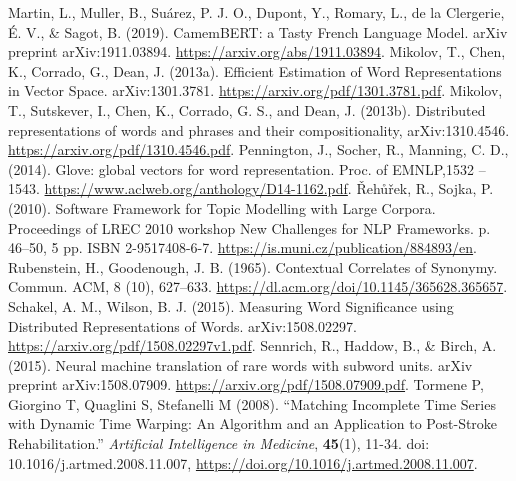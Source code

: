 \documentclass[11pt,french,french]{article}
\begin{document}
\begin{thebibliography}{999}
 Martin, L., Muller, B., Suárez, P. J. O., Dupont, Y., Romary, L., de la Clergerie, É. V., \& Sagot, B. (2019). CamemBERT: a Tasty French Language Model. arXiv preprint arXiv:1911.03894. \url{https://arxiv.org/abs/1911.03894}.
 Mikolov, T.,  Chen, K., Corrado, G., Dean, J. (2013a). Efficient Estimation of Word Representations in Vector Space. arXiv:1301.3781. \url{https://arxiv.org/pdf/1301.3781.pdf}.
 Mikolov, T., Sutskever, I., Chen, K., Corrado, G. S., and Dean, J. (2013b). Distributed representations of words and phrases and their compositionality, arXiv:1310.4546. \url{https://arxiv.org/pdf/1310.4546.pdf}.
 Pennington, J., Socher, R., Manning, C. D., (2014).  Glove: global vectors for word representation. Proc. of EMNLP,1532 – 1543. \url{https://www.aclweb.org/anthology/D14-1162.pdf}.
 {\v R}eh{\r u}{\v r}ek, R.,  Sojka, P. (2010). Software Framework for Topic Modelling with Large Corpora. Proceedings of LREC 2010 workshop New Challenges for NLP Frameworks. p. 46--50, 5 pp. ISBN 2-9517408-6-7. \url{https://is.muni.cz/publication/884893/en}.
 Rubenstein, H.,  Goodenough, J. B. (1965). Contextual Correlates of Synonymy. Commun. ACM, 8 (10), 627–633. \url{https://dl.acm.org/doi/10.1145/365628.365657}.
 Schakel, A. M., Wilson, B. J. (2015). Measuring Word Significance using Distributed Representations of Words. arXiv:1508.02297. \url{https://arxiv.org/pdf/1508.02297v1.pdf}.
 Sennrich, R., Haddow, B., \& Birch, A. (2015). Neural machine translation of rare words with subword units. arXiv preprint arXiv:1508.07909. \url{https://arxiv.org/pdf/1508.07909.pdf}.
 Tormene P, Giorgino T, Quaglini S, Stefanelli M (2008). “Matching
Incomplete Time Series with Dynamic Time Warping: An Algorithm and an Application to Post-Stroke Rehabilitation.” \emph{Artificial Intelligence
in Medicine}, \textbf{45}(1), 11-34. doi: 10.1016/j.artmed.2008.11.007, \url{https://doi.org/10.1016/j.artmed.2008.11.007}.
\end{thebibliography}
\end{document}
